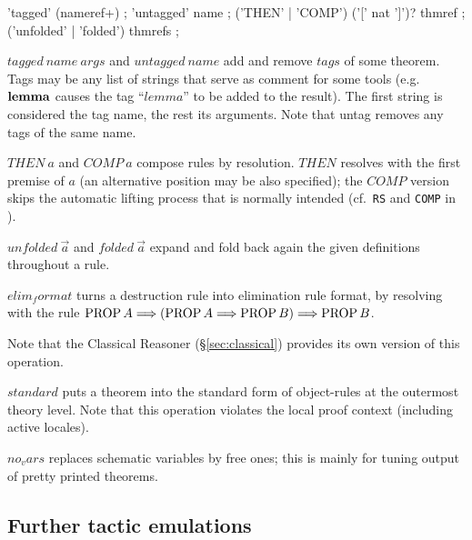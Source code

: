 \begin{rail}
  'tagged' (nameref+)
  ;
  'untagged' name
  ;
  ('THEN' | 'COMP') ('[' nat ']')? thmref
  ;
  ('unfolded' | 'folded') thmrefs
  ;
\end{rail}

\begin{descr}

\item [$tagged~name~args$ and $untagged~name$] add and remove $tags$ of some
  theorem.  Tags may be any list of strings that serve as comment for some
  tools (e.g.\ ${\mathord{\mathbf{lemma}}}$ causes the tag ``$lemma$'' to be added to the
  result).  The first string is considered the tag name, the rest its
  arguments.  Note that untag removes any tags of the same name.

\item [$THEN~a$ and $COMP~a$] compose rules by resolution.  $THEN$ resolves
  with the first premise of $a$ (an alternative position may be also
  specified); the $COMP$ version skips the automatic lifting process that is
  normally intended (cf.\ \texttt{RS} and \texttt{COMP} in
  \cite[\S5]{isabelle-ref}).
  
\item [$unfolded~\vec a$ and $folded~\vec a$] expand and fold back
  again the given definitions throughout a rule.

\item [$elim_format$] turns a destruction rule into elimination rule format,
  by resolving with the rule $\mathop{\mathrm{PROP}} A \Longrightarrow (\mathop{\mathrm{PROP}} A \Longrightarrow \mathop{\mathrm{PROP}} B) \Longrightarrow \mathop{\mathrm{PROP}}
  B$.
  
  Note that the Classical Reasoner (\S\ref{sec:classical}) provides its own
  version of this operation.

\item [$standard$] puts a theorem into the standard form of object-rules at
  the outermost theory level.  Note that this operation violates the local
  proof context (including active locales).

\item [$no_vars$] replaces schematic variables by free ones; this is mainly
  for tuning output of pretty printed theorems.

\end{descr}


\subsection{Further tactic emulations}\label{sec:tactics}

